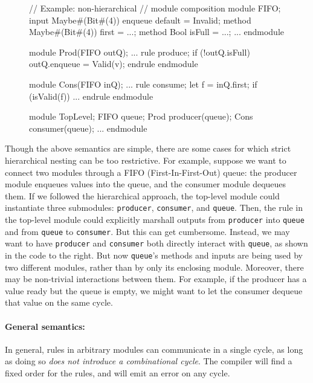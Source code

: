 \begin{figure}
\vspace{-1.5em}
\begin{mscode}
// Example: non-hierarchical
// module composition
module FIFO;
  input Maybe#(Bit#(4))
   enqueue default = Invalid;
  method Maybe#(Bit#(4))
   first = ...;
  method Bool isFull = ...;
  ...
endmodule

module Prod(FIFO outQ);
  ...
  rule produce;
    if (!outQ.isFull)
     outQ.enqueue = Valid(v);
  endrule
endmodule

module Cons(FIFO inQ);
  ...
  rule consume;
    let f = inQ.first;
    if (isValid(f)) ...
  endrule
endmodule

module TopLevel;
  FIFO queue;
  Prod producer(queue);
  Cons consumer(queue);
  ...
endmodule
\end{mscode}
\vspace{-4em}
\end{figure}

Though the above semantics are simple, there are some cases for which strict hierarchical nesting can be too restrictive.
For example, suppose we want to connect two modules through a FIFO (First-In-First-Out) queue:
the producer module enqueues values into the queue, and the consumer module dequeues them.
If we followed the hierarchical approach, the top-level module could instantiate three submodules:
\texttt{producer}, \texttt{consumer}, and \texttt{queue}.
Then, the rule in the top-level module could explicitly marshall outputs
from \texttt{producer} into \texttt{queue} and from \texttt{queue} to \texttt{consumer}.
But this can get cumbersome.
Instead, we may want to have \texttt{producer} and \texttt{consumer} both directly
interact with \texttt{queue}, as shown in the code to the right.
But now \texttt{queue}'s methods and inputs are being used by two different modules,
rather than by only its enclosing module.
Moreover, there may be non-trivial interactions between them.
For example, if the producer has a value ready but the queue is empty,
we might want to let the consumer dequeue that value on the same cycle.

\paragraph{General semantics:}
In general, rules in arbitrary modules can communicate in a single cycle, as long as
doing so \emph{does not introduce a combinational cycle}.
The compiler will find a fixed order for the rules, and will emit an error on any cycle.

